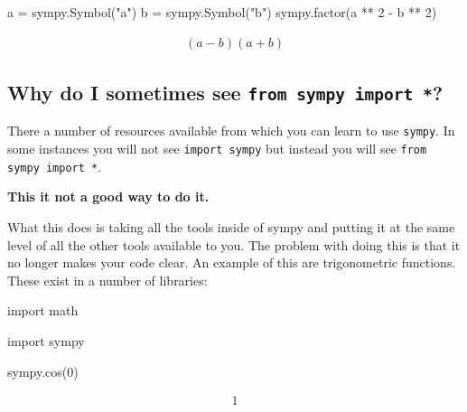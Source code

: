 \begin{pyin}
\begin{pyin}
a = sympy.Symbol("a")
b = sympy.Symbol("b")
sympy.factor(a ** 2 - b ** 2)
\end{pyin}




\begin{equation*}
\begin{split}\displaystyle \left(a - b\right) \left(a + b\right)\end{split}
\end{equation*}




\subsection{Why do I sometimes see \texttt{from sympy import *}?}
\label{\detokenize{tools-for-mathematics/02-algebra/why/main:why-do-i-sometimes-see-from-sympy-import}}

There a number of resources available from which you can learn to use \texttt{sympy}. In
some instances you will not see \texttt{import sympy} but instead you will see 
\texttt{from sympy import *}.


\textbf{This it not a good way to do it.}


What this does is taking all the tools inside of sympy and putting it at the
same level of all the other tools available to you.
The problem with doing this is that it no longer makes your code clear.
An example of this are trigonometric functions. These exist in a number of
libraries:

\begin{pyin}
import math
\end{pyin}







\begin{pyin}
import sympy
\end{pyin}







\begin{pyin}
sympy.cos(0)
\end{pyin}




\begin{equation*}
\begin{split}\displaystyle 1\end{split}
\end{equation*}







\end{pyin}
